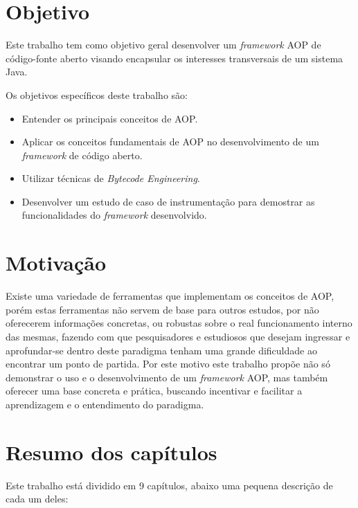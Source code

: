 \documentclass[tc,oneside]{iiufrgs}
\begin{document}
\section{Objetivo}
Este trabalho tem como objetivo geral desenvolver um \textit{framework} AOP de código-fonte aberto visando encapsular os interesses transversais de um sistema Java.

Os objetivos específicos deste trabalho são: 

\begin{itemize}
\item Entender os principais conceitos de AOP.
\item Aplicar os conceitos fundamentais de AOP no desenvolvimento de um \textit{framework} de código aberto.
\item Utilizar técnicas de \textit{Bytecode Engineering}.
\item Desenvolver um estudo de caso de instrumentação para demostrar as funcionalidades do \textit{framework} desenvolvido.
\end{itemize}

\section{Motivação}

Existe uma variedade de ferramentas que implementam os conceitos de AOP, porém estas ferramentas não servem de base para outros estudos, por não oferecerem informações concretas, ou robustas sobre o real funcionamento interno das mesmas, fazendo com que pesquisadores e estudiosos que desejam ingressar e aprofundar-se dentro deste paradigma tenham uma grande dificuldade ao encontrar um ponto de partida. Por este motivo este trabalho propõe não só demonstrar o uso e o desenvolvimento de um \textit{framework} AOP, mas também oferecer uma base concreta e prática, buscando incentivar e facilitar a aprendizagem e o entendimento do paradigma.

\section{Resumo dos capítulos}

Este trabalho está dividido em 9 capítulos, abaixo uma pequena descrição de cada um deles:
\end{document}
